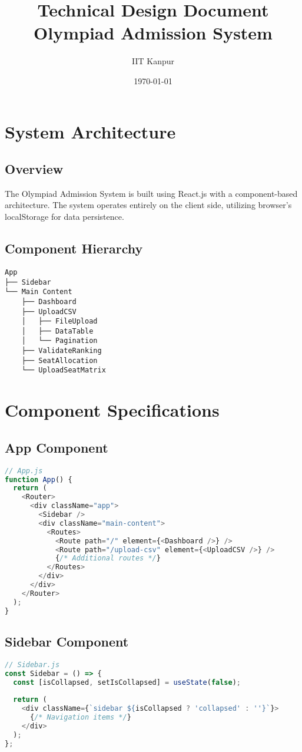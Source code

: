 \documentclass[12pt,a4paper]{article}
\title{Technical Design Document\\
       Olympiad Admission System}
\author{IIT Kanpur}
\date{\today}
\begin{document}
\maketitle
\tableofcontents
\newpage

\section{System Architecture}
\subsection{Overview}
The Olympiad Admission System is built using React.js with a component-based architecture. The system operates entirely on the client side, utilizing browser's localStorage for data persistence.

\subsection{Component Hierarchy}
\begin{verbatim}
App
├── Sidebar
└── Main Content
    ├── Dashboard
    ├── UploadCSV
    │   ├── FileUpload
    │   ├── DataTable
    │   └── Pagination
    ├── ValidateRanking
    ├── SeatAllocation
    └── UploadSeatMatrix
\end{verbatim}

\section{Component Specifications}

\subsection{App Component}
\begin{lstlisting}[language=JavaScript]
// App.js
function App() {
  return (
    <Router>
      <div className="app">
        <Sidebar />
        <div className="main-content">
          <Routes>
            <Route path="/" element={<Dashboard />} />
            <Route path="/upload-csv" element={<UploadCSV />} />
            {/* Additional routes */}
          </Routes>
        </div>
      </div>
    </Router>
  );
}
\end{lstlisting}

\subsection{Sidebar Component}
\begin{lstlisting}[language=JavaScript]
// Sidebar.js
const Sidebar = () => {
  const [isCollapsed, setIsCollapsed] = useState(false);
  
  return (
    <div className={`sidebar ${isCollapsed ? 'collapsed' : ''}`}>
      {/* Navigation items */}
    </div>
  );
};
\end{lstlisting}
\end{document}
